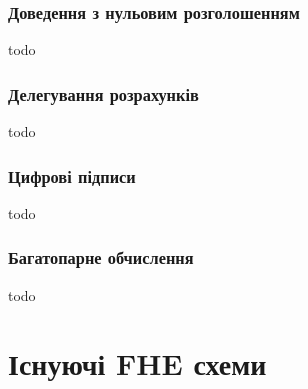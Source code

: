 \subsubsection*{Доведення з нульовим розголошенням}
todo
\subsubsection*{Делегування розрахунків}
todo
\subsubsection*{Цифрові підписи}
todo
\subsubsection*{Багатопарне обчислення}
todo


\section{Існуючі FHE схеми}



